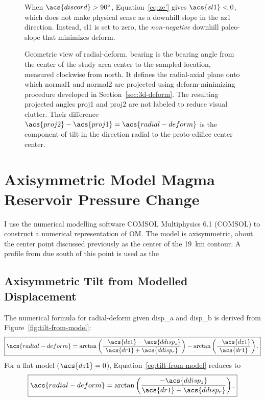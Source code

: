 \begin{figure}
    {\caption[Reversal case: $\acs{discord}>\ang{90}$]{When $\acs{discord}>\ang{90}$, Equation~\eqref{eq:ze'} gives $\acs{sl1}<0$, which does not make physical sense as a downhill slope in the \acs{az1} direction. Instead, \acs{sl1} is set to zero, the \emph{non-negative} downhill paleo-slope that minimizes \acs{deform}.}\label{fig:reversal}}
    {\hspace*{-0.4\linewidth}}
    \vspace*{-9em}
    {\caption[Calculation of \acf{radial-deform} from mapping]{Geometric view of \acl{radial-deform}. \acs{bearing} is the bearing angle from the center of the study area \acs{center} to the sampled location, measured clockwise from \acf{north}. It defines the radial-axial plane onto which \acs{normal1} and \acs{normal2} are projected using \acs{deform}-minimizing procedure developed in Section~\ref{sec:3d-deform}. The resulting projected angles \acs{proj1} and \acs{proj2} are not labeled to reduce visual clutter. Their difference $\acs{proj2}-\acs{proj1}=\acs{radial-deform}$ is the component of tilt in the direction radial to the proto-edifice center \acs{center}.}\label{fig:radial}}
    {}
\end{figure}

\section{Axisymmetric Model Magma Reservoir Pressure Change}

I use the numerical modelling software COMSOL Multiphysics 6.1 (COMSOL) to construct a numerical representation of \acf{OM}. The model is axisymmetric, about the center point discussed previously as the center of the \qty{19}{\km} contour. A profile from due south of this point is used as the 

\subsection{Axisymmetric Tilt from Modelled Displacement}

The numerical formula for \acf{radial-deform} given \acs{disp_a} and \acs{disp_b} is derived from Figure~\ref{fig:tilt-from-model}:
\begin{equation}
    \boxed{\acs{radial-deform} = 
    \arctan\left(\dfrac{-\acs{dz1}-\acs{ddisp_z}}{\acs{dr1}+\acs{ddisp_r}}\right) - \arctan\left(\frac{-\acs{dz1}}{\acs{dr1}}\right).}\label{eq:tilt-from-model}
\end{equation}
For a flat model ($\acs{dz1} = 0$), Equation~\eqref{eq:tilt-from-model} reduces to
\begin{equation}
    \boxed{\acs{radial-deform} = 
    \arctan\left(\dfrac{-\acs{ddisp_z}}{\acs{dr1}+\acs{ddisp_r}}\right).}\label{eq:tilt-from-flat-model}
\end{equation}

